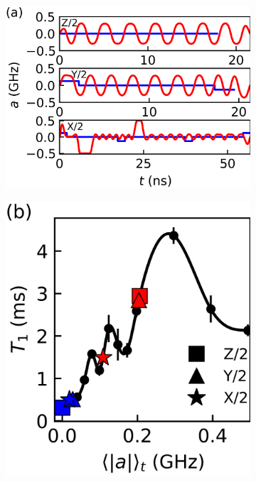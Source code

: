 \documentclass[
  amsfonts,
  amsmath,
  tbtags,
  amssymb,
  aps,
  nobibnotes,
  twocolumn,
]{revtex4-2}
\begin{document}
\begin{figure}[ht]
  \begin{subfigure}{.6\linewidth}
    \includegraphics[width=\linewidth]{assets/f1a.png}
  \end{subfigure}%
    \begin{subfigure}{.4\linewidth}
    \includegraphics[width=\linewidth]{assets/f1b.png}
  \end{subfigure}
  

\end{figure}
\end{document}

